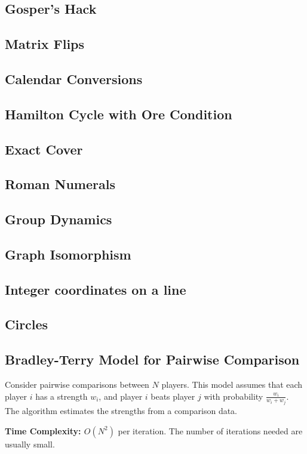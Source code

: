 \subsection{Gosper's Hack}
\subsection{Matrix Flips}
\subsection{Calendar Conversions}
\subsection{Hamilton Cycle with Ore Condition}
\subsection{Exact Cover}
\subsection{Roman Numerals}
\subsection{Group Dynamics}
\subsection{Graph Isomorphism}
\subsection{Integer coordinates on a line}
\subsection{Circles}
\subsection{Bradley-Terry Model for Pairwise Comparison}

Consider pairwise comparisons between $N$ players.
This model assumes that each player $i$ has a strength $w_i$,
and player $i$ beats player $j$ with probability $\frac{w_i}{w_i + w_j}$.
The algorithm estimates the strengths from a comparison data.

\textbf{Time Complexity: $O(N^2)$} per iteration. The number of iterations needed are usually small.

